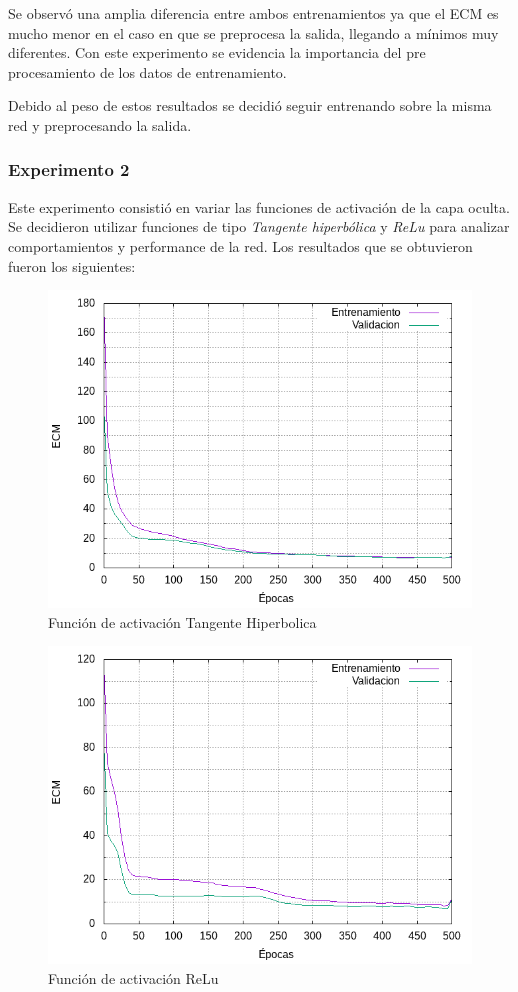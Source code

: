 Se observó una amplia diferencia entre ambos entrenamientos ya que el ECM es mucho menor en el caso en que se preprocesa la salida, llegando
a mínimos muy diferentes. Con este experimento se evidencia la importancia del pre procesamiento de los datos de entrenamiento.

Debido al peso de estos resultados se decidió seguir entrenando sobre la misma red y preprocesando la salida.

\subsubsection{Experimento 2}
Este experimento consistió en variar las funciones de activación de la capa oculta. Se decidieron utilizar funciones de tipo \textit{Tangente hiperbólica} y \textit{ReLu}
para analizar comportamientos y performance de la red. Los resultados que se obtuvieron fueron los siguientes:

\begin{figure}[H]
  \includegraphics[width=125mm]{imagenes/ej2/ex_2-1_red-9-17-2_errors.png}
  \caption{Función de activación Tangente Hiperbolica}
\end{figure}

\begin{figure}[H]
  \includegraphics[width=125mm]{imagenes/ej2/ex_2-2_red-9-17-2_errors.png}
  \caption{Función de activación ReLu}
\end{figure}

